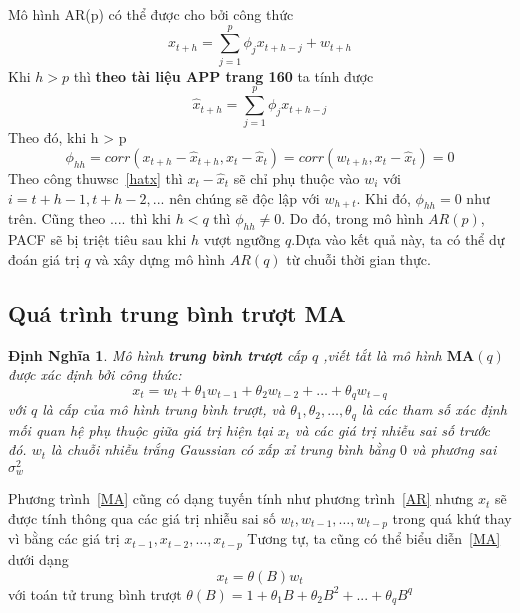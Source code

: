 \documentclass[twoside,12pt]{Latex/Classes/PhDthesisPSnPDF}
\newtheorem{defi}{Định Nghĩa}[chapter]
\begin{document}
Mô hình AR(p) có thể được cho bởi công thức 
\begin{equation}
	x_{t+h} = \sum\limits_{j=1}^{p}\phi_{j}x_{t+h-j}+w_{t+h}
\end{equation}
Khi $h > p$ thì \textbf{theo tài liệu APP trang 160} ta tính được 
\begin{equation}
	\hat{x}_{t+h} = \sum\limits_{j=1}^{p}\phi_{j}x_{t+h-j}
\end{equation} 
Theo đó, khi h > p
\begin{equation}
\phi_{hh} = corr(x_{t+h}-\hat{x}_{t+h},x_{t}-\hat{x}_{t}) = corr (w_{t+h},x_t-\hat{x}_t) = 0
\end{equation}
Theo công thuwsc~\ref{hatx} thì $x_{t}-\hat{x}_{t}$ sẽ chỉ phụ thuộc vào $w_i$ với $i=t+h-1,t+h-2,...$ nên chúng sẽ độc lập với $w_{h+t}$. Khi đó, $\phi_{hh} = 0$ như trên. Cũng theo .... thì khi $h<q$ thì $\phi_{hh}\neq 0$. Do đó, trong mô hình $AR(p)$, PACF sẽ bị triệt tiêu sau khi $h$ vượt ngưỡng $q$.Dựa vào kết quả này, ta có thể dự đoán giá trị $q$ và xây dựng mô hình $AR(q)$ từ chuỗi thời gian thực.

\subsection{Quá trình trung bình trượt MA}
\begin{defi} 
	Mô hình \textbf{trung bình trượt} cấp $q$ ,viết tắt là mô hình $\textbf{MA}(q)$ được xác định bởi công thức:
	\begin{equation}\label{MA}
		x_t = w_t + \theta_1w_{t-1} + \theta_2w_{t-2} +\dots+\theta_qw_{t-q}
	\end{equation}
	với $q$ là cấp của mô hình trung bình trượt, và $\theta_1, \theta_2,\dots,\theta_q$ là các tham số xác định mối quan hệ phụ thuộc giữa giá trị hiện tại $x_t$ và các giá trị nhiễu sai số trước đó. $w_t$ là chuỗi nhiễu trắng Gaussian có xấp xỉ trung bình bằng $0$ và phương sai $\sigma^2_w$
\end{defi}
Phương trình~\ref{MA} cũng có dạng tuyến tính như phương trình~\ref{AR} nhưng $x_t$ sẽ được tính thông qua các giá trị nhiễu sai số $w_t, w_{t-1},\dots,w_{t-p}$ trong quá khứ thay vì bằng các giá trị $x_{t-1},x_{t-2},\dots,x_{t-p}$
Tương tự, ta cũng có thể biểu diễn~\ref{MA} dưới dạng
\begin{equation}
	x_t = \theta(B)w_t
\end{equation}
với toán tử trung bình trượt $\theta(B) = 1+ \theta_1B+\theta_2B^2+...+\theta_qB^q$
\end{document}

